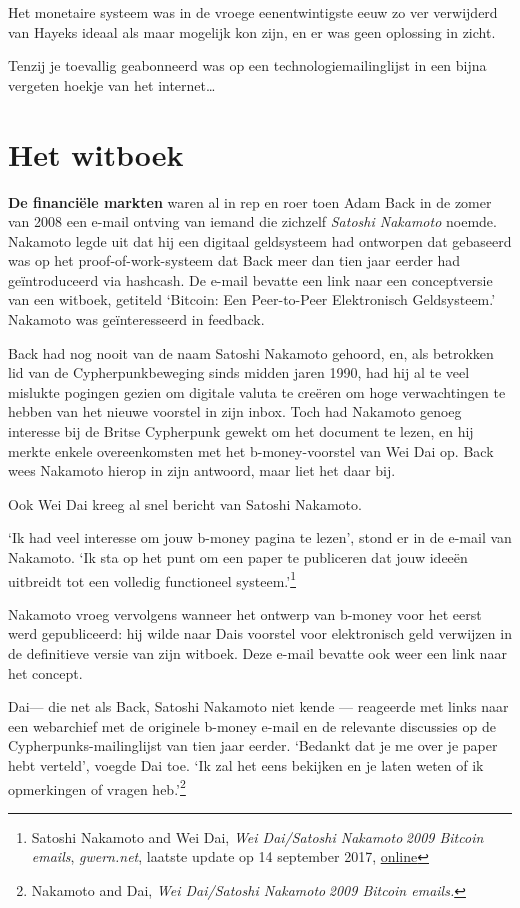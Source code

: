 \documentclass[
  a5paper,
  smalldemyvopaper,11pt,twoside,onecolumn,openright,extrafontsizes,
hidelinks]{memoir}
\begin{document}
Het monetaire systeem was in de vroege eenentwintigste eeuw zo ver
verwijderd van Hayeks ideaal als maar mogelijk kon zijn, en er was geen
oplossing in zicht.

Tenzij je toevallig geabonneerd was op een technologiemailinglijst in
een bijna vergeten hoekje van het internet\ldots{}

\chapter{Het witboek}\label{het-witboek}

\textbf{De financiële markten} waren al in rep en roer toen Adam Back in
de zomer van 2008 een e-mail ontving van iemand die zichzelf
\emph{Satoshi Nakamoto} noemde. Nakamoto legde uit dat hij een digitaal
geldsysteem had ontworpen dat gebaseerd was op het proof-of-work-systeem
dat Back meer dan tien jaar eerder had geïntroduceerd via hashcash. De
e-mail bevatte een link naar een conceptversie van een witboek, getiteld
`Bitcoin: Een Peer-to-Peer Elektronisch Geldsysteem.' Nakamoto was
geïnteresseerd in feedback.

Back had nog nooit van de naam Satoshi Nakamoto gehoord, en, als
betrokken lid van de Cypherpunkbeweging sinds midden jaren 1990, had hij
al te veel mislukte pogingen gezien om digitale valuta te creëren om
hoge verwachtingen te hebben van het nieuwe voorstel in zijn inbox. Toch
had Nakamoto genoeg interesse bij de Britse Cypherpunk gewekt om het
document te lezen, en hij merkte enkele overeenkomsten met het
b-money-voorstel van Wei Dai op. Back wees Nakamoto hierop in zijn
antwoord, maar liet het daar bij.

Ook Wei Dai kreeg al snel bericht van Satoshi Nakamoto.

`Ik had veel interesse om jouw b-money pagina te lezen', stond er in de
e-mail van Nakamoto. `Ik sta op het punt om een paper te publiceren dat
jouw ideeën uitbreidt tot een volledig functioneel systeem.'\footnote{Satoshi
  Nakamoto and Wei Dai, \emph{Wei Dai/Satoshi Nakamoto 2009 Bitcoin
  emails}, \emph{gwern.net}, laatste update op 14 september 2017,
  \href{https://gwern.net/doc/bitcoin/2008-nakamoto}{online}}

Nakamoto vroeg vervolgens wanneer het ontwerp van b-money voor het eerst
werd gepubliceerd: hij wilde naar Dais voorstel voor elektronisch geld
verwijzen in de definitieve versie van zijn witboek. Deze e-mail bevatte
ook weer een link naar het concept.

Dai--- die net als Back, Satoshi Nakamoto niet kende --- reageerde met
links naar een webarchief met de originele b-money e-mail en de
relevante discussies op de Cypherpunks-mailinglijst van tien jaar
eerder. `Bedankt dat je me over je paper hebt verteld', voegde Dai toe.
`Ik zal het eens bekijken en je laten weten of ik opmerkingen of vragen
heb.'\footnote{Nakamoto and Dai, \emph{Wei Dai/Satoshi Nakamoto 2009
  Bitcoin emails.}}
\end{document}
